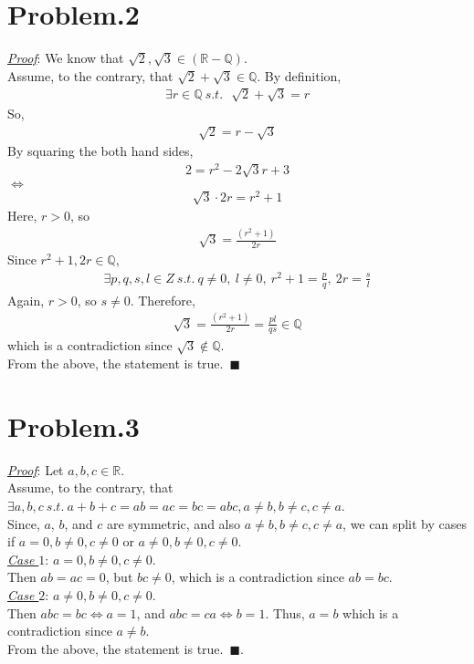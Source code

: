\documentclass[12pt]{article}
\begin{document}
\section*{Problem.2}
\underline{\textit{Proof}}: We know that $\sqrt{2}, \sqrt{3} \in \mathbb{(R-Q)}$.\\[1em]
Assume, to the contrary, that $\sqrt{2} + \sqrt{3} \in \mathbb{Q}$. By definition,
\begin{gather*}
\exists r \in \mathbb{Q} ~s.t.~ ~~\sqrt{2} + \sqrt{3} = r
\end{gather*}
So,
\begin{gather*}
\sqrt{2} = r - \sqrt{3}
\end{gather*}
By squaring the both hand sides,
\begin{gather*}
2 = r^2 - 2 \sqrt{3} r + 3
\end{gather*}
$\Leftrightarrow$
\begin{gather*}
\sqrt{3} \cdot 2 r = r^2 + 1
\end{gather*}
Here, $r > 0$, so
\begin{gather*}
\sqrt{3} = \frac{(r^2 + 1)}{2 r}
\end{gather*}
Since $r^2 + 1, 2r \in \mathbb{Q}$,
\begin{gather*}
\exists p, q, s, l \in{Z} ~s.t.~ q \neq 0,~l \neq 0,~ r^2 + 1 = \frac{p}{q},~ 2 r = \frac{s}{l}
\end{gather*}
Again, $r > 0$, so $s \neq 0$. Therefore,
\begin{gather*}
\sqrt{3} = \frac{(r^2 + 1)}{2 r} = \frac{pl}{qs} \in \mathbb{Q}
\end{gather*}
which is a contradiction since $\sqrt{3} \notin \mathbb{Q}$.\\[1em]
From the above, the statement is true.~$\blacksquare$

\section*{Problem.3}
\underline{\textit{Proof}}: Let $a, b, c \in \mathbb{R}$.\\[1em]
Assume, to the contrary, that $\exists a, b, c ~s.t.~ a+b+c = ab = ac = bc = abc, a \neq b, b \neq c, c \neq a$.\\[1em]
Since, $a$, $b$, and $c$ are symmetric, and also $a \neq b, b \neq c, c \neq a$,  we can split by cases if $a = 0, b \neq 0, c \neq 0 $ or $a \neq 0, b \neq 0, c \neq 0$.\\[1em]
\underline{\textit{Case $1$}}: $a = 0, b \neq 0, c \neq 0$.\\[1em]
Then $ab = ac = 0$,  but $bc \neq 0$, which is a contradiction  since $ab = bc$.\\[1em]
\underline{\textit{Case $2$}}: $a \neq 0, b \neq 0, c \neq 0$.\\[1em]
Then $abc = bc \Leftrightarrow a = 1$, and $abc = ca \Leftrightarrow b = 1$. Thus, $a = b$ which is a contradiction since $a \neq b$.\\[1em]
From the above, the statement is true.~$\blacksquare$.
\end{document}
